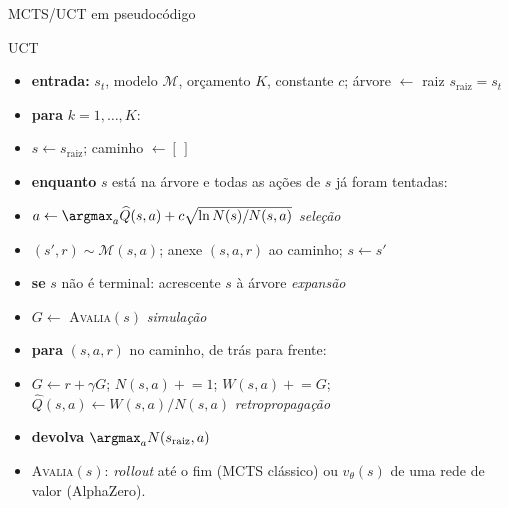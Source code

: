 \documentclass[aspectratio=169, 11pt]{beamer}
\newcommand{\Mmod}{\mathcal{M}}                 %
\newcommand{\Nv}[1]{N(#1)}                      %
\newcommand{\Qh}{\widehat{Q}}                   %
\newcommand{\ret}{G}                            %
\newcommand{\raiz}{s_{\mathrm{raiz}}}
\begin{document}
\begin{frame}{MCTS/UCT em pseudocódigo}
  {\scriptsize
  \begin{algbox}{UCT}
    \begin{itemize}\setlength{\itemsep}{0.15ex}
      \item[] \textbf{entrada:} $s_t$, modelo $\Mmod$, orçamento $K$, constante $c$;
              árvore $\gets$ raiz $\raiz = s_t$
      \item[] \textbf{para} $k = 1, \dots, K$:
      \item[] \quad $s \gets \raiz$; \; caminho $\gets [\,]$
      \item[] \quad \textbf{enquanto} $s$ está na árvore e todas as ações de $s$ já foram tentadas:
      \item[] \quad\quad $a \gets \argmax_{a} \Qh(s,a) + c\sqrt{\ln \Nv{s}/\Nv{s,a}}$
              \hfill\textit{\color{rlCinza}\scriptsize seleção}
      \item[] \quad\quad $(s', r) \sim \Mmod(s,a)$; \; anexe $(s,a,r)$ ao caminho; \; $s \gets s'$
      \item[] \quad \textbf{se} $s$ não é terminal: acrescente $s$ à árvore
              \hfill\textit{\color{rlCinza}\scriptsize expansão}
      \item[] \quad $\ret \gets$ \textsc{Avalia}$(s)$
              \hfill\textit{\color{rlCinza}\scriptsize simulação}
      \item[] \quad \textbf{para} $(s,a,r)$ no caminho, de trás para frente:
      \item[] \quad\quad $\ret \gets r + \gamma \ret$; \;
              $\Nv{s,a} \mathrel{+}= 1$; \;
              $W(s,a) \mathrel{+}= \ret$; \;
              $\Qh(s,a) \gets W(s,a)/\Nv{s,a}$
              \hfill\textit{\color{rlCinza}\scriptsize retropropagação}
      \item[] \textbf{devolva} $\argmax_{a} \Nv{\raiz,a}$
      \item[] \rule{0pt}{1.1em}\textsc{Avalia}$(s)$: \emph{rollout} até o fim
              (MCTS clássico) ou $v_\theta(s)$ de uma rede de valor (AlphaZero).
    \end{itemize}
  \end{algbox}}
\end{frame}
\end{document}
